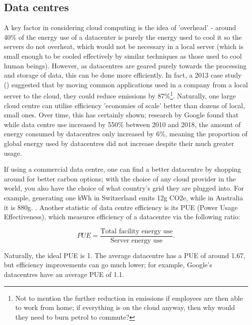 \documentclass{article}
\begin{document}
\subsection{Data centres}
A key factor in considering cloud computing is the idea of 'overhead' - around 40\% of the energy use of a datacenter is purely the energy used to cool it so the servers do not overheat,  \citep{lannelongue2021ten} which would not be necessary in a local server (which is small enough to be cooled effectively by similar techniques as those used to cool human beings). However, as datacentres are geared purely towards the processing and storage of data, this can be done more efficiently. In fact, a 2013 case study (\citet{masanet2013energy}) suggested that by moving common applications used in a company from a local server to the cloud, they could reduce emissions by 87\%\footnote{Not to mention the further reduction in emissions if employees are then able to work from home; if everything is on the cloud anyway, then why would they need to burn petrol to commute?}. Naturally, one large cloud centre can utilise efficiency 'economies of scale' better than dozens of local, small ones. Over time, this has certainly shown; research by Google found that while data centre use increased by 550\% between 2010 and 2018, the amount of energy consumed by datacentres only increased by 6\%, meaning the proportion of global energy used by datacentres did not increase despite their much greater usage. \citep{masanet2020recalibrating}\newline

If using a commercial data centre, one can find a better datacentre by shopping around for better carbon options; with the choice of any cloud provider in the world, you also have the choice of what country's grid they are plugged into. For example, generating one kWh in Switzerland emits 12g CO2e, while in Australia it is 880g. \citep{grealey2021carbon}. Another statistic of data centre efficiency is its PUE (Power Usage Effectiveness), which measures efficiency of a datacentre via the following ratio:

$$PUE = \frac{\textrm{Total facility energy use}}{\textrm{Server energy use}}.$$

Naturally, the ideal PUE is 1. The average datacentre has a PUE of around 1.67, but efficiency improvements can go much lower; for example, Google's datacentres have an average PUE of 1.1. \citep{holzle2020data}\newline
\end{document}
